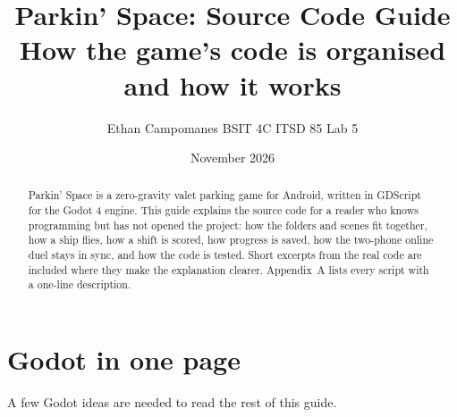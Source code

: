 \documentclass[11pt,a4paper]{article}
\title{\textbf{Parkin' Space: Source Code Guide}\\[4pt]
\large How the game's code is organised and how it works}
\author{Ethan Campomanes \quad BSIT 4C \quad ITSD 85 Lab 5}
\date{November 2026}
\begin{document}
\maketitle

\begin{abstract}
\noindent Parkin' Space is a zero-gravity valet parking game for Android, written in GDScript for the Godot 4 engine. This guide explains the source code for a reader who knows programming but has not opened the project: how the folders and scenes fit together, how a ship flies, how a shift is scored, how progress is saved, how the two-phone online duel stays in sync, and how the code is tested. Short excerpts from the real code are included where they make the explanation clearer. Appendix~A lists every script with a one-line description.
\end{abstract}

\tableofcontents
\newpage

\section{Godot in one page}
A few Godot ideas are needed to read the rest of this guide.
\end{document}
